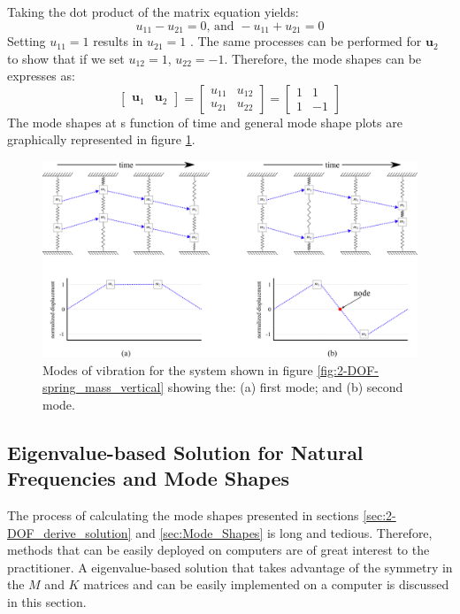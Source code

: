\documentclass[12pt,letter]{article}
\numberwithin{ex}{section} %
\numberwithin{re}{section} %
\begin{document}
Taking the dot product of the matrix equation yields:
\begin{equation}
	u_{11} - u_{21}=0 \text{, and } - u_{11} + u_{21}=0
\end{equation}
Setting $u_{11} = 1$ results in $u_{21} = 1$ . The same processes can be performed for $\mathbf{u}_2$ to show that if we set $u_{12} = 1$, $u_{22} = -1$. Therefore, the mode shapes can be expresses as:
\begin{equation}
	 \begin{bmatrix} \mathbf{u}_1 & \mathbf{u}_2 \end{bmatrix} = \begin{bmatrix}  u_{11} & u_{12} \\ u_{21} & u_{22} \end{bmatrix} = \begin{bmatrix}  1 & 1 \\ 1 & -1 \end{bmatrix}
\end{equation}
The mode shapes at s function of time and general mode shape plots are graphically represented in figure \ref{fig:2-DOF_mode_shape}. 

\begin{figure}[H]
	\centering
	\includegraphics[]{../Figures/2-DOF_mode_shape.png}
	\caption{Modes of vibration for the system shown in figure \ref{fig:2-DOF-spring_mass_vertical} showing the: (a) first mode; and (b) second mode.}
	\label{fig:2-DOF_mode_shape}
\end{figure}


\subsection{Eigenvalue-based Solution for Natural Frequencies and Mode Shapes}

The process of calculating the mode shapes presented in sections \ref{sec:2-DOF_derive_solution} and \ref{sec:Mode_Shapes} is long and tedious. Therefore, methods that can be easily deployed on computers are of great interest to the practitioner. A eigenvalue-based solution that takes advantage of the symmetry in the $M$ and $K$ matrices and can be easily implemented on a computer is discussed in this section. 
\end{document}

